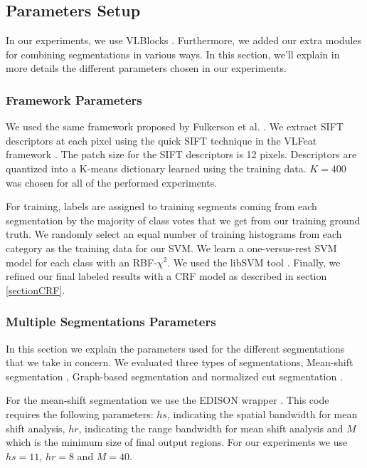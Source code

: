 \documentclass[10pt,twocolumn,letterpaper]{article}
\begin{document}
\subsection{Parameters Setup}

In our experiments, we use VLBlocks \cite{fulkerson09class}. Furthermore, we added our
extra modules for combining segmentations in various ways. In this section, we'll explain in more details
the different parameters chosen in our experiments.

\subsubsection{Framework Parameters}

We used the same framework proposed by Fulkerson et al. \cite{fulkerson09class}.
We extract SIFT descriptors at each pixel using the quick SIFT technique in
the VLFeat framework \cite{vedaldi08vlfeat}. The patch size for the SIFT
descriptors is 12 pixels. Descriptors are quantized into a K-means dictionary
learned using the training data. $K = 400$ was chosen for all of the performed
experiments.

For training, labels are assigned to training segments coming from each segmentation by the
majority of class votes that we get from our training ground truth. We randomly
select an equal number of training histograms from each category as the training
data for our SVM. We learn a one-versus-rest SVM model for each class with an RBF-$\chi^2$. We
used the libSVM tool \cite{libsvm}. Finally, we refined our final labeled
results with a CRF model as described in section \ref{sectionCRF}.

\subsubsection{Multiple Segmentations Parameters}

In this section we explain the parameters used for the different segmentations that we
take in concern. We evaluated three types of segmentations,
Mean-shift segmentation \cite{Comaniciu02meanshift}, Graph-based segmentation
\cite{Felzenszwalb04efficientgraph-based} and normalized cut segmentation \cite{Shi_2000_3808}.

For the mean-shift segmentation we use the EDISON wrapper
\cite{Christoudias02synergismin}. This code requires the following parameters:
$hs$, indicating the spatial bandwidth for mean shift analysis,
$hr$, indicating the range bandwidth for mean shift analysis
and $M$ which is the minimum size of final output regions.
For our experiments we use $hs = 11$, $hr = 8$ and $M = 40$.
\end{document}
